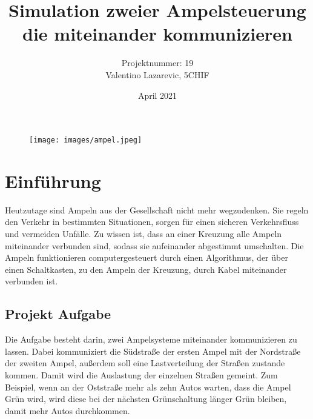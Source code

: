 \documentclass[12pt, oneside]{article}
\title{Simulation zweier Ampelsteuerung die miteinander kommunizieren}
\author{Projektnummer: 19 \\ Valentino Lazarevic, 5CHIF}
\date{April 2021}
\begin{document}
\begin{titlepage}
\maketitle

\begin{figure}[H]
    \centering
    \texttt{[image: images/ampel.jpeg]}
\end{figure}

\end{titlepage}

\tableofcontents
\newpage



\section{Einführung}
Heutzutage sind Ampeln aus der Gesellschaft nicht mehr wegzudenken. Sie regeln den Verkehr in bestimmten Situationen, sorgen für einen sicheren Verkehrsfluss und vermeiden Unfälle. Zu wissen ist, dass an einer Kreuzung alle Ampeln miteinander verbunden sind, sodass sie aufeinander abgestimmt umschalten. Die Ampeln funktionieren computergesteuert durch einen Algorithmus, der über einen Schaltkasten, zu den Ampeln der Kreuzung, durch Kabel miteinander verbunden ist. 

\subsection{Projekt Aufgabe}
Die Aufgabe besteht darin, zwei Ampelsysteme miteinander kommunizieren zu lassen. Dabei kommuniziert die Südstraße der ersten Ampel mit der Nordstraße der zweiten Ampel, außerdem soll eine Lastverteilung der Straßen zustande kommen. Damit wird die Auslastung der einzelnen Straßen gemeint. Zum Beispiel, wenn an der Oststraße mehr als zehn Autos warten, dass die Ampel Grün wird, wird diese bei der nächsten Grünschaltung länger Grün bleiben, damit mehr Autos durchkommen.
\end{document}
